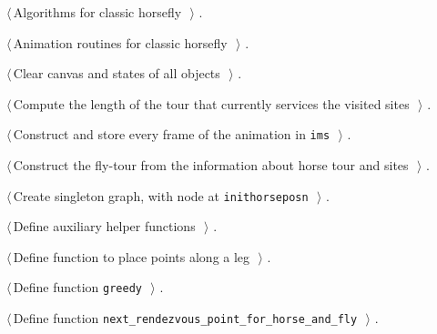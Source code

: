 \documentclass[11.5pt]{report}
\begin{document}
{\small\begin{list}{}{\setlength{\itemsep}{-\parsep}\setlength{\itemindent}{-\leftmargin}}
\item $\langle\,$Algorithms for classic horsefly\nobreak\ {\footnotesize {}}$\,\rangle$ {\footnotesize {\NWtxtRefIn} .}
\item $\langle\,$Animation routines for classic horsefly\nobreak\ {\footnotesize {}}$\,\rangle$ {\footnotesize {\NWtxtRefIn} .}
\item $\langle\,$Clear canvas and states of all objects\nobreak\ {\footnotesize {}}$\,\rangle$ {\footnotesize {\NWtxtRefIn} .}
\item $\langle\,$Compute the length of the tour that currently services the visited sites\nobreak\ {\footnotesize {}}$\,\rangle$ {\footnotesize {\NWtxtRefIn} .}
\item $\langle\,$Construct and store every frame of the animation in \verb|ims|\nobreak\ {\footnotesize {}}$\,\rangle$ {\footnotesize {\NWtxtRefIn} .}
\item $\langle\,$Construct the fly-tour from the information about horse tour and sites\nobreak\ {\footnotesize {}}$\,\rangle$ {\footnotesize {\NWtxtRefIn} .}
\item $\langle\,$Create singleton graph, with node at \verb|inithorseposn|\nobreak\ {\footnotesize {}}$\,\rangle$ {\footnotesize {\NWtxtRefIn} .}
\item $\langle\,$Define auxiliary helper functions\nobreak\ {\footnotesize {}}$\,\rangle$ {\footnotesize {\NWtxtRefIn} .}
\item $\langle\,$Define function to place points along a leg\nobreak\ {\footnotesize {}}$\,\rangle$ {\footnotesize {\NWtxtRefIn} .}
\item $\langle\,$Define function \verb|greedy|\nobreak\ {\footnotesize {}}$\,\rangle$ {\footnotesize {\NWtxtRefIn} .}
\item $\langle\,$Define function \verb|next_rendezvous_point_for_horse_and_fly|\nobreak\ {\footnotesize {}}$\,\rangle$ {\footnotesize {\NWtxtRefIn} .}

\end{list}}
\end{document}
